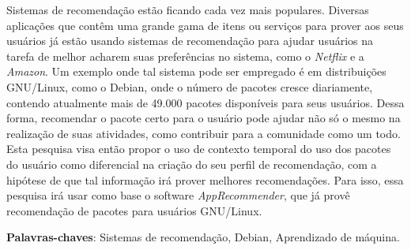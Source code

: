 \begin{resumo}

Sistemas de recomendação estão ficando cada vez mais populares. Diversas
aplicações que contêm uma grande gama de itens ou serviços para prover aos seus
usuários já estão usando sistemas de recomendação para ajudar usuários na
tarefa de melhor acharem suas preferências no sistema, como o \textit{Netflix} e
a \textit{Amazon}. Um exemplo onde tal sistema pode ser empregado é em
distribuições GNU/Linux, como
o Debian, onde o número de pacotes cresce diariamente,
contendo atualmente mais de 49.000 pacotes disponíveis para seus usuários.
Dessa forma, recomendar o pacote certo para o usuário pode ajudar não só o mesmo
na realização de suas atividades, como contribuir para a comunidade como um todo.
Esta pesquisa visa então propor o uso de contexto temporal do uso dos pacotes do
usuário como diferencial na criação do seu perfil de recomendação, com a
hipótese de que tal informação irá prover melhores recomendações. Para isso,
essa pesquisa irá usar como base o software \textit{AppRecommender},
que já provê recomendação de pacotes para usuários GNU/Linux.


 \vspace{\onelineskip}

 \noindent
 \textbf{Palavras-chaves}: Sistemas de recomendação, Debian, Aprendizado de
 máquina.
\end{resumo}
